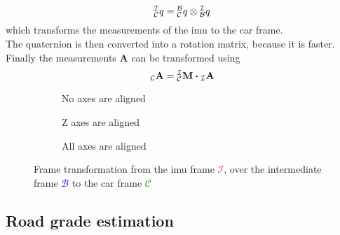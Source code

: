 \begin{equation}
	\qtf{i}{c} = \qtf{b}{c} \otimes  \qtf{i}{b}
\end{equation}
which transforms the measurements of the \gls{imu} to the car frame.\\
The quaternion is then converted into a rotation matrix, because it is faster.
Finally the measurements $\mathbf{A}$ can be transformed using
\begin{equation}
	\vincs{A}{c} = \mtf{i}{c} \vdot \vincs{A}{i}
\end{equation}
\begin{figure}[htbp]
	\centering
	\begin{subfigure}[b]{0.3\textwidth}
		\centering
		
		\caption{No axes are aligned}
		\label{fig:tikz_frame_transformation_init}
	\end{subfigure}
	\hfill
	\begin{subfigure}[b]{0.3\textwidth}
		\centering
		
		\caption{Z axes are aligned}
		\label{fig:tikz_frame_transformation_intermediate}
	\end{subfigure}
	\hfill
	\begin{subfigure}[b]{0.3\textwidth}
		\centering
		
		\caption{All axes are aligned}
		\label{fig:tikz_frame_transformation_final}
	\end{subfigure}
	\caption[Frame transformation]{Frame transformation from the \gls{imu} frame \textcolor{red}{$\mathcal{I}$}, over the intermediate frame \textcolor{blue}{$\mathcal{B}$} to the car frame \textcolor{green}{$\mathcal{C}$}}
	\label{fig:tikz_frame_transformation}
\end{figure}

\subsection{Road grade estimation}
\label{ssec:road_grade_estimation}
